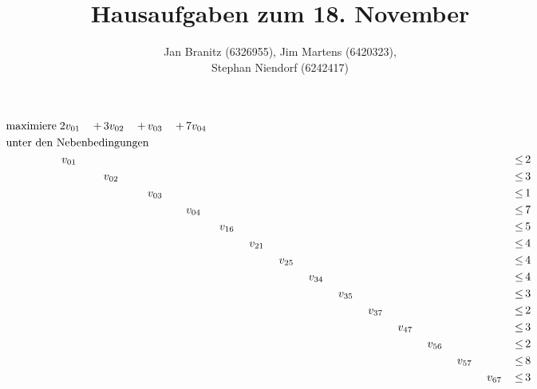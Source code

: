 \documentclass[10pt,a4paper,oneside,ngerman,numbers=noenddot]{scrartcl}
\begin{document}
\author{Jan Branitz (6326955), Jim Martens (6420323),\\
Stephan Niendorf (6242417)}
\title{Hausaufgaben zum 18. November}
\maketitle
\section{} %
	\subsection{} %
		\begin{alignat*}{15}
			\text{maximiere}\; & 2v_{01} \,&+&\, 3v_{02} \,&+&\, v_{03} \,&+&\, 7v_{04} && && && && && && && && && && && \\
			\multicolumn{30}{l}{\text{unter den Nebenbedingungen}} && \\
			\;&\, v_{01} \,&& && && && && && && && && && && && && \,&\leq &\, 2 \\
			\;& &&\, v_{02} \,&& && && && && && && && && && && && \,&\leq &\, 3 \\
			\;& && &&\, v_{03} \,&& && && && && && && && && && && \,&\leq &\, 1 \\
			\;& && && &&\, v_{04} \,&& && && && && && && && && && \,&\leq &\, 7 \\
			\;& && && && &&\, v_{16} \,&& && && && && && && && && \,&\leq &\, 5 \\
			\;& && && && && &&\, v_{21} \,&& && && && && && && && \,&\leq &\, 4 \\
			\;& && && && && && &&\, v_{25} \,&& && && && && && && \,&\leq &\, 4 \\
			\;& && && && && && && &&\, v_{34} \,&& && && && && && \,&\leq &\, 4 \\
			\;& && && && && && && && &&\, v_{35} \,&& && && && && \,&\leq &\, 3 \\
			\;& && && && && && && && && &&\, v_{37} \,&& && && && \,&\leq &\, 2 \\
			\;& && && && && && && && && && &&\, v_{47} \,&& && && \,&\leq &\, 3 \\
			\;& && && && && && && && && && && &&\, v_{56} \,&& && \,&\leq &\, 2 \\
			\;& && && && && && && && && && && && &&\, v_{57} \,&& \,&\leq &\, 8 \\
			\;& && && && && && && && && && && && && &&\, v_{67} \,&\leq &\, 3 \\

\end{alignat*}
\end{document}
